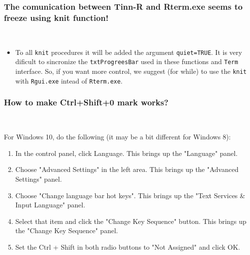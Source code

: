 \subsubsection{The comunication between Tinn-R and Rterm.exe seems to freeze using knit function!}\\

\begin{itemize}
  \item To all \texttt{knit} procedures it will be added the argument \texttt{quiet=TRUE}.
    It is very dificult to sincronize the \texttt{txtProgreesBar} used in these functions and
    \texttt{Term} interface. So, if you want more control, we suggest (for while) to use the \texttt{knit}
    with \texttt{Rgui.exe} intead of \texttt{Rterm.exe}.
\end{itemize}

\subsubsection{How to make Ctrl+Shift+0 mark works?}\\

For Windows 10, do the following (it may be a bit different for Windows 8):
\begin{enumerate}
  \item In the control panel, click Language. This brings up the "Language" panel.
  \item Choose "Advanced Settings" in the left area. This brings up the "Advanced Settings" panel.
  \item Choose "Change language bar hot keys". This brings up the "Text Services \& Input Language" panel.
  \item Select that item and click the "Change Key Sequence" button. This brings up the "Change Key Sequence" panel.
  \item Set the Ctrl + Shift in both radio buttons to "Not Assigned" and click OK.
\end{enumerate}

